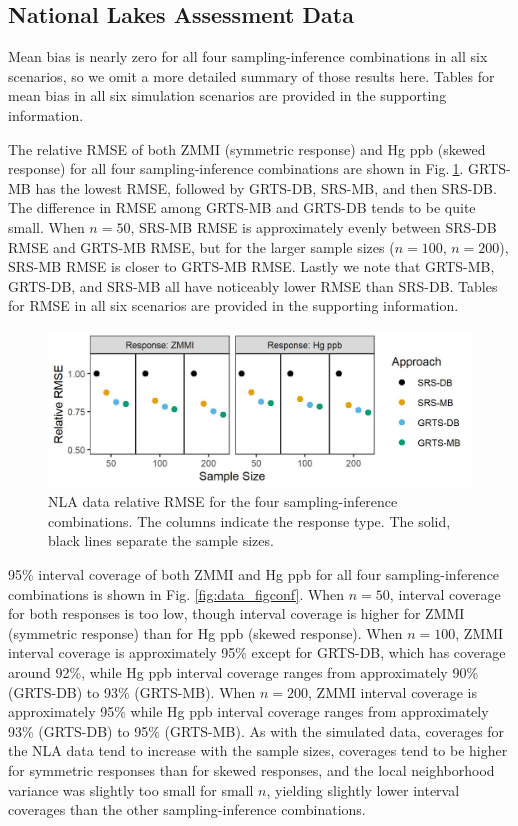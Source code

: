 \documentclass[]{elsarticle} %
\begin{document}
\hypertarget{sec:r_app}{%
\subsection{National Lakes Assessment Data}\label{sec:r_app}}

Mean bias is nearly zero for all four sampling-inference combinations in
all six scenarios, so we omit a more detailed summary of those results
here. Tables for mean bias in all six simulation scenarios are provided
in the supporting information.

The relative RMSE of both ZMMI (symmetric response) and Hg ppb (skewed
response) for all four sampling-inference combinations are shown in
Fig.\(~\)\ref{fig:data_rmspe_eff}. GRTS-MB has the lowest RMSE, followed
by GRTS-DB, SRS-MB, and then SRS-DB. The difference in RMSE among
GRTS-MB and GRTS-DB tends to be quite small. When \(n = 50\), SRS-MB
RMSE is approximately evenly between SRS-DB RMSE and GRTS-MB RMSE, but
for the larger sample sizes (\(n = 100\), \(n = 200\)), SRS-MB RMSE is
closer to GRTS-MB RMSE. Lastly we note that GRTS-MB, GRTS-DB, and SRS-MB
all have noticeably lower RMSE than SRS-DB. Tables for RMSE in all six
scenarios are provided in the supporting information.

\begin{figure}
  \centering
  \includegraphics[width = 1\linewidth]{figures/data_rmspe_eff.jpeg}
  \caption{NLA data relative RMSE for the four sampling-inference combinations. The columns indicate the response type. The solid, black lines separate the sample sizes.}
  \label{fig:data_rmspe_eff}
\end{figure}

95\% interval coverage of both ZMMI and Hg ppb for all four
sampling-inference combinations is shown in Fig. \ref{fig:data_figconf}.
When \(n = 50\), interval coverage for both responses is too low, though
interval coverage is higher for ZMMI (symmetric response) than for Hg
ppb (skewed response). When \(n = 100\), ZMMI interval coverage is
approximately 95\% except for GRTS-DB, which has coverage around 92\%,
while Hg ppb interval coverage ranges from approximately 90\% (GRTS-DB)
to 93\% (GRTS-MB). When \(n = 200\), ZMMI interval coverage is
approximately 95\% while Hg ppb interval coverage ranges from
approximately 93\% (GRTS-DB) to 95\% (GRTS-MB). As with the simulated
data, coverages for the NLA data tend to increase with the sample sizes,
coverages tend to be higher for symmetric responses than for skewed
responses, and the local neighborhood variance was slightly too small
for small \(n\), yielding slightly lower interval coverages than the
other sampling-inference combinations.
\end{document}
